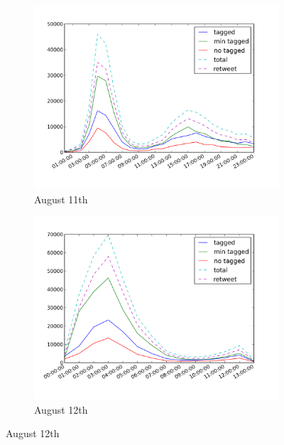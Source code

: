 \documentclass[a4paper,twoside,12pt,openright]{report}
\begin{document}
\begin{figure}[H]
\begin{subfigure}[t]{0.48\textwidth}
\begin{center}
	\includegraphics[width=\textwidth]{images/freqs/freq_11_08.png}
	\caption{August 11th}
\end{center}
\end{subfigure}
\hfill
\begin{subfigure}[t]{0.48\textwidth}
\begin{center}
	\includegraphics[width=\textwidth]{images/freqs/freq_12_08.png}
	\caption{August 12th}
\end{center}
\end{subfigure}


\end{figure}
\end{document}
